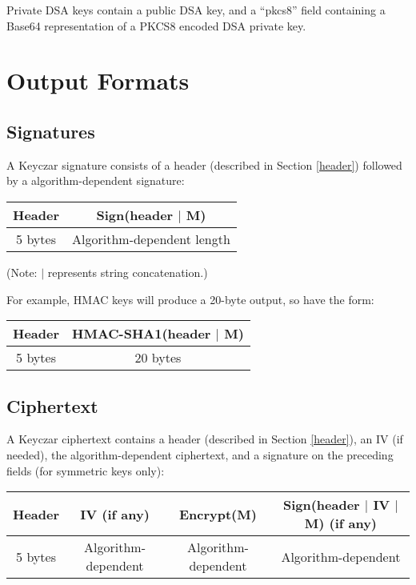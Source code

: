 \documentclass{llncs}
\begin{document}
Private DSA keys contain a public DSA key, and a ``pkcs8'' field containing a
Base64 representation of a PKCS8 encoded DSA private key.

\section{Output Formats}

\subsection{Signatures}\label{signatures}

A Keyczar signature consists of a header (described in Section \ref{header})
followed by a algorithm-dependent signature:

\vspace*{3mm}
\begin{tabular}{| c | c |}
\hline
Header & Sign(header $|$ M) \\
\hline 5 bytes & Algorithm-dependent length \\ \hline
\end{tabular}
\vspace*{3mm}

(Note: $|$ represents string concatenation.)

\vspace*{3mm}

For example, HMAC keys will produce a 20-byte output, so have the form:

\vspace*{3mm}
\begin{tabular}{| c | c |}
\hline
Header & HMAC-SHA1(header $|$ M) \\ \hline
5 bytes & 20 bytes \\ \hline
\end{tabular}
\vspace*{3mm}
\subsection{Ciphertext}

A Keyczar ciphertext contains a header (described in Section \ref{header}), an
IV (if needed), the algorithm-dependent ciphertext, and a signature on the
preceding fields (for symmetric keys only):

\vspace*{3mm}
\begin{tabular}{| c | c | c | c |}
\hline
Header & IV (if any) & Encrypt(M) & Sign(header $|$ IV $|$ M) (if any) \\ \hline
5 bytes & Algorithm-dependent & Algorithm-dependent & Algorithm-dependent \\
\hline
\end{tabular}
\vspace*{3mm}
\end{document}
